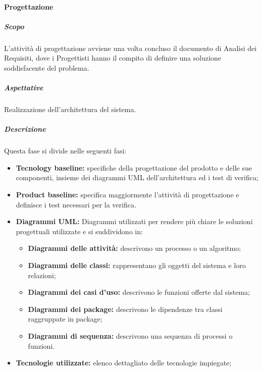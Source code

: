 			\paragraph {Progettazione}
				\subparagraph{Scopo}
					L'attività di progettazione avviene una volta concluso il documento di Analisi dei Requisiti, dove i Progettisti hanno il compito di definire una soluzione soddisfacente del problema.
				\subparagraph{Aspettative}
					Realizzazione dell'architettura del sistema.
				\subparagraph{Descrizione}
					Questa fase si divide nelle seguenti fasi: 
					\begin{itemize}
						\item \textbf{Tecnology baseline:} specifiche della progettazione del prodotto e delle sue componenti, insieme dei diagrammi UML dell'architettura ed i test di verifica;
						\item \textbf{Product baseline:} specifica maggiormente l'attività di progettazione e definisce i test necessari per la verifica. 
						\item \textbf{Diagrammi UML:} Diagrammi utilizzati per rendere più chiare le soluzioni progettuali utilizzate e si suddividono in:	
						\begin{itemize}
							\item \textbf{Diagrammi delle attività:} descrivono un processo o un algoritmo;
							\item \textbf{Diagrammi delle classi:} rappresentano gli oggetti del sistema e loro relazioni;
							\item \textbf{Diagrammi dei casi d'uso:} descrivono le funzioni offerte dal sistema;
							\item \textbf{Diagrammi dei package:} descrivono le dipendenze tra classi raggruppate in package;
							\item \textbf{Diagrammi di sequenza:} descrivono una sequenza di processi o funzioni.
						\end{itemize}
						\item \textbf{Tecnologie utilizzate:} elenco dettagliato delle tecnologie impiegate; 
						\end{itemize}	
				
